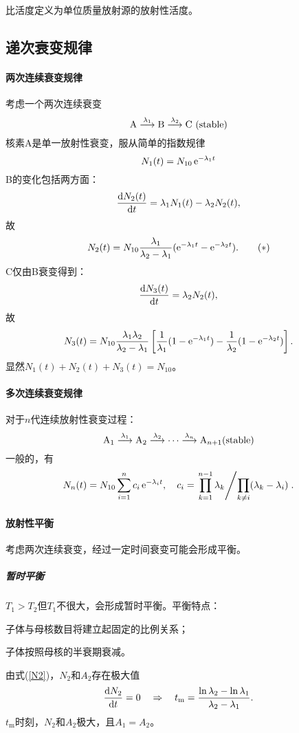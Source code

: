 
比活度定义为单位质量放射源的放射性活度。

\subsection{递次衰变规律}
\paragraph{两次连续衰变规律}
考虑一个两次连续衰变
\[
	\mathrm{A}\overset{\lambda_1}{\longrightarrow }\mathrm{B}\overset{\lambda_2}{\longrightarrow }\mathrm{C}~(\mathrm{stable})
\]
核素A是单一放射性衰变，服从简单的指数规律
\[
	N_1(t)=N_{10}\mathop{}\!\mathrm{e}^{-\lambda_1t}
\]
B的变化包括两方面：
\[
	\frac{\mathrm{d}^{\;\!\!}N_2(t)}{\mathrm{d} t^{\;\!\!}}=\lambda_1N_1(t)-\lambda_2N_2(t),
\]
故
\[\label{N2}
	N_2(t)=N_{10}\frac{\lambda_1}{\lambda_2-\lambda_1}(\mathop{}\!\mathrm{e}^{-\lambda_1t}-\mathop{}\!\mathrm{e}^{-\lambda_2t}).\tag{$\ast$}
\]
C仅由B衰变得到：
\[
	\frac{\mathrm{d}^{\;\!\!}N_3(t)}{\mathrm{d} t^{\;\!\!}}=\lambda_2N_2(t),
\]
故
\[
	N_3(t)=N_{10}\frac{\lambda_1\lambda_2}{\lambda_2-\lambda_1}\left[\frac1{\lambda_1}(1-\mathop{}\!\mathrm{e}^{-\lambda_1t})-\frac1{\lambda_2}(1-\mathop{}\!\mathrm{e}^{-\lambda_2t})\right].
\]
显然$N_1(t)+N_2(t)+N_3(t)=N_{10}$。
\paragraph{多次连续衰变规律}
对于$n$代连续放射性衰变过程：
\[
	\mathrm{A}_1\overset{\lambda_1}{\longrightarrow }\mathrm{A}_2\overset{\lambda_2}{\longrightarrow }\cdots\overset{\lambda_n}{\longrightarrow }\mathrm{A}_{n+1}(\mathrm{stable})
\]
一般的，有
\[
	N_n(t)=N_{10}\sum_{i=1}^nc_i\mathop{}\!\mathrm{e}^{-\lambda_it},\quad c_i=\left.\prod_{k=1}^{n-1}\lambda_k\middle\slash \prod_{k\neq i}(\lambda_k-\lambda_i)\right..
\]
\paragraph{放射性平衡}考虑两次连续衰变，经过一定时间衰变可能会形成平衡。
\subparagraph{暂时平衡}$T_1>T_2$但$T_1$不很大，会形成暂时平衡。平衡特点：
\begin{compactenum}
	\item 子体与母核数目将建立起固定的比例关系；
	\item 子体按照母核的半衰期衰减。
\end{compactenum}
由式(\ref{N2})，$N_2$和$A_2$存在极大值
\begin{align}
	\frac{\mathrm{d}^{\;\!\!}N_2}{\mathrm{d} t^{\;\!\!}}=0\quad\Rightarrow\quad t_\mathrm m=\frac{\ln\lambda_2-\ln\lambda_1}{\lambda_2-\lambda_1}.
\end{align}
$t_\mathrm m$时刻，$N_2$和$A_2$极大，且$A_1=A_2$。


